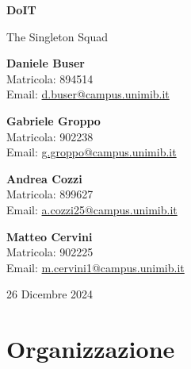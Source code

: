 \documentclass[a4paper,12pt]{report}
\begin{document}
    \begin{titlepage}
        \centering
        \vspace*{2cm}

        \Huge
        \textbf{DoIT}

        \vspace{1.5cm}

        \Large The Singleton Squad

        \vfill

        \small
        \textbf{Daniele Buser} \\
        Matricola: 894514 \\
        Email: \href{mailto:d.buser@campus.unimib.it}{d.buser@campus.unimib.it}

        \vspace{0.4cm}

        \small
        \textbf{Gabriele Groppo} \\
        Matricola: 902238 \\
        Email: \href{mailto:g.groppo@campus.unimib.it }{g.groppo@campus.unimib.it }

        \vspace{0.4cm}

        \small
        \textbf{Andrea Cozzi} \\
        Matricola: 899627 \\
        Email: \href{mailto:a.cozzi25@campus.unimib.it }{a.cozzi25@campus.unimib.it
        }

        \vspace{0.4cm}

        \small
        \textbf{Matteo Cervini} \\
        Matricola: 902225 \\
        Email: \href{mailto:m.cervini1@campus.unimib.it
    }{m.cervini1@campus.unimib.it }

        \vspace{0.4cm}

        \small
        26 Dicembre 2024

        \vspace{2cm}
    \end{titlepage}

    \newpage

    \tableofcontents

    \newpage

    \chapter{Organizzazione}\label{ch:organizzazione}
\end{document}
